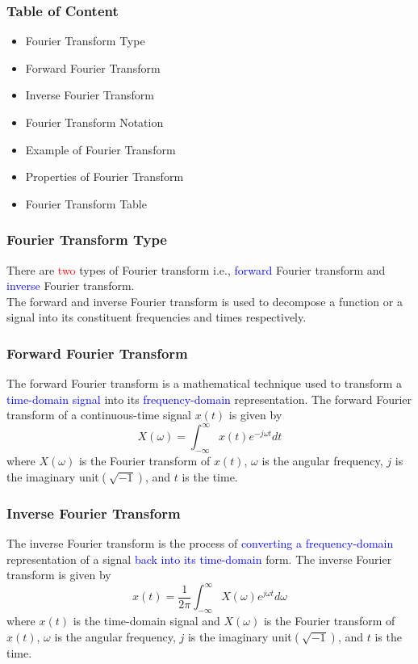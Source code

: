 \documentclass[aspectratio=1610]{beamer}
\begin{document}
\begin{frame}
    \frametitle{Table of Content}
    \begin{itemize}[label=$\star$, itemsep=15pt, parsep=0pt, topsep=10pt]
        \item <1-> Fourier Transform Type
        \item <2-> Forward Fourier Transform
        \item <3-> Inverse Fourier Transform
        \item <4-> Fourier Transform Notation
        \item <5-> Example of Fourier Transform
        \item <6-> Properties of Fourier Transform
        \item <7-> Fourier Transform Table
    \end{itemize}
\end{frame}

\begin{frame}
    \frametitle{Fourier Transform Type}
    There are \textcolor{red}{two} types of Fourier transform i.e., \textcolor{blue}{forward} Fourier transform and \textcolor{blue}{inverse} Fourier transform.\\
    The forward and inverse Fourier transform is used to decompose a function or a signal into its constituent frequencies and times respectively.
\end{frame}

\begin{frame}
    \frametitle{Forward Fourier Transform}
    The forward Fourier transform is a mathematical technique used to transform a \textcolor{blue}{time-domain signal} into its \textcolor{blue}{frequency-domain} representation.
    The forward Fourier transform of a continuous-time signal $x(t)$ is given by
    \begin{equation*}
        X(\omega) = \int_{-\infty}^{\infty} x(t) e^{-j\omega t} dt
    \end{equation*}
    where $X(\omega)$ is the Fourier transform of $x(t)$, $\omega$ is the angular frequency, $j$ is the imaginary unit$(\sqrt{-1})$, and $t$ is the time.
\end{frame}

\begin{frame}
    \frametitle{Inverse Fourier Transform}
    The inverse Fourier transform is the process of \textcolor{blue}{converting a frequency-domain} representation of a signal \textcolor{blue}{back into its time-domain} form.
    The inverse Fourier transform is given by
    \begin{equation*}
        x(t) =\frac{1}{2\pi} \int_{-\infty}^{\infty} X(\omega) e^{j\omega t} d\omega
    \end{equation*}
    where $x(t)$ is the time-domain signal and $X(\omega)$ is the Fourier transform of $x(t)$, $\omega$ is the angular frequency, $j$ is the imaginary unit$(\sqrt{-1})$, and $t$ is the time.
\end{frame}
\end{document}
